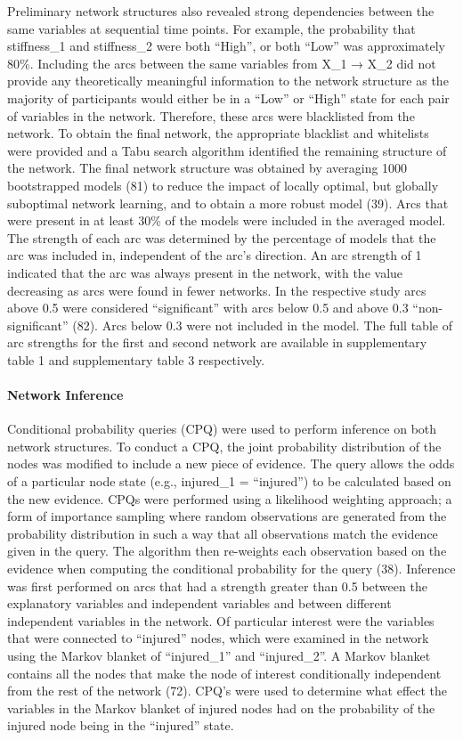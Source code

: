 \documentclass[
  english,
  man]{apa6}
\let\oldparagraph\paragraph
\renewcommand{\paragraph}[1]{\oldparagraph{#1}\mbox{}}
\begin{document}
Preliminary network structures also revealed strong dependencies between the same variables at sequential time points. For example, the probability that stiffness\_1 and stiffness\_2 were both ``High'', or both ``Low'' was approximately 80\%. Including the arcs between the same variables from X\_1 → X\_2 did not provide any theoretically meaningful information to the network structure as the majority of participants would either be in a ``Low'' or ``High'' state for each pair of variables in the network. Therefore, these arcs were blacklisted from the network.
To obtain the final network, the appropriate blacklist and whitelists were provided and a Tabu search algorithm identified the remaining structure of the network.
The final network structure was obtained by averaging 1000 bootstrapped models (81) to reduce the impact of locally optimal, but globally suboptimal network learning, and to obtain a more robust model (39). Arcs that were present in at least 30\% of the models were included in the averaged model.
The strength of each arc was determined by the percentage of models that the arc was included in, independent of the arc's direction. An arc strength of 1 indicated that the arc was always present in the network, with the value decreasing as arcs were found in fewer networks. In the respective study arcs above 0.5 were considered ``significant'' with arcs below 0.5 and above 0.3 ``non-significant'' (82).
Arcs below 0.3 were not included in the model. The full table of arc strengths for the first and second network are available in supplementary table 1 and supplementary table 3 respectively.

\hypertarget{network-inference}{%
\paragraph{Network Inference}\label{network-inference}}

Conditional probability queries (CPQ) were used to perform inference on both network structures. To conduct a CPQ, the joint probability distribution of the nodes was modified to include a new piece of evidence. The query allows the odds of a particular node state (e.g., injured\_1 = ``injured'') to be calculated based on the new evidence. CPQs were performed using a likelihood weighting approach; a form of importance sampling where random observations are generated from the probability distribution in such a way that all observations match the evidence given in the query. The algorithm then re-weights each observation based on the evidence when computing the conditional probability for the query (38). Inference was first performed on arcs that had a strength greater than 0.5 between the explanatory variables and independent variables and between different independent variables in the network. Of particular interest were the variables that were connected to ``injured'' nodes, which were examined in the network using the Markov blanket of ``injured\_1'' and ``injured\_2''. A Markov blanket contains all the nodes that make the node of interest conditionally independent from the rest of the network (72). CPQ's were used to determine what effect the variables in the Markov blanket of injured nodes had on the probability of the injured node being in the ``injured'' state.
\end{document}
